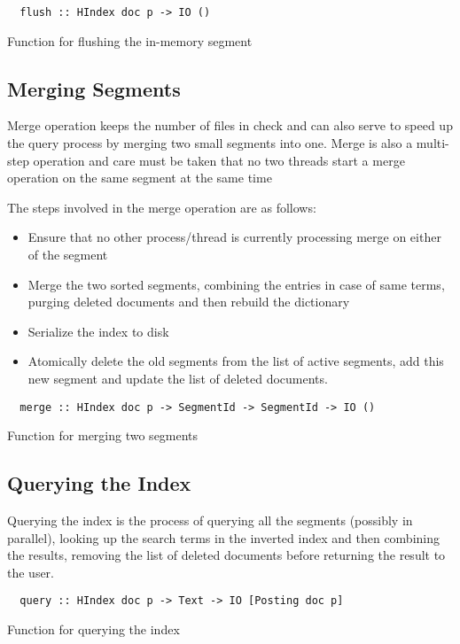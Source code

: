 \begin{listing}
\begin{verbatim}
  flush :: HIndex doc p -> IO ()
\end{verbatim}
\caption{Function for flushing the in-memory segment}
\end{listing}

\subsection{Merging Segments}
Merge operation keeps the number of files in check and can also serve to speed up the query process by merging two small segments into one.
Merge is also a multi-step operation and care must be taken that no two threads start a merge operation on the same segment at the same time

The steps involved in the merge operation are as follows:
\begin{itemize}
\item Ensure that no other process/thread is currently processing merge on either of the segment
\item Merge the two sorted segments, combining the entries in case of same terms, purging deleted documents and then rebuild the dictionary
\item Serialize the index to disk
\item Atomically delete the old segments from the list of active segments, add this new segment and update the list of deleted documents.
\end{itemize}

\begin{listing}
\begin{verbatim}
  merge :: HIndex doc p -> SegmentId -> SegmentId -> IO ()
\end{verbatim}
\caption{Function for merging two segments}
\end{listing}

\subsection{Querying the Index}
Querying the index is the process of querying all the segments (possibly in parallel), looking up the search terms in the inverted index and then
combining the results, removing the list of deleted documents before returning the result to the user.

\begin{listing}
\begin{verbatim}
  query :: HIndex doc p -> Text -> IO [Posting doc p]
\end{verbatim}
\caption{Function for querying the index}
\end{listing}


